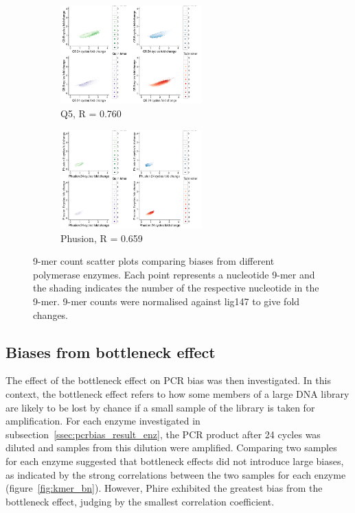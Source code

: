 \documentclass[parskip=full, numbers=noenddot]{scrreprt}
\begin{document}
\begin{figure}[htb]
\begin{subfigure}[htb]{0.6\textwidth}
    \centering
    \includegraphics[width=0.6\textwidth]{kmer_q5}
    \caption{Q5, R = 0.760}
    \label{fig:kmer_enz_q5}
  \end{subfigure}
  \begin{subfigure}[htb]{0.6\textwidth}
    \centering
    \includegraphics[width=0.6\textwidth]{kmer_phusion}
    \caption{Phusion, R = 0.659}
    \label{fig:kmer_enz_phusion}
  \end{subfigure}
  \caption{9-mer count scatter plots comparing biases from different polymerase enzymes.  Each point represents a nucleotide 9-mer and the shading indicates the number of the respective nucleotide in the 9-mer.  9-mer counts were normalised against lig147 to give fold changes.}
  \label{fig:kmer_enz}
\end{figure}

\subsection{Biases from bottleneck effect}
\label{ssec:pcrbias_result_bn}

The effect of the bottleneck effect on PCR bias was then investigated.  In this context, the bottleneck effect refers to how some members of a large DNA library are likely to be lost by chance if a small sample of the library is taken for amplification.  For each enzyme investigated in subsection~\ref{ssec:pcrbias_result_enz}, the PCR product after 24 cycles was diluted and samples from this dilution were amplified.  Comparing two samples for each enzyme suggested that bottleneck effects did not introduce large biases, as indicated by the strong correlations between the two samples for each enzyme (figure~\ref{fig:kmer_bn}).  However, Phire exhibited the greatest bias from the bottleneck effect, judging by the smallest correlation coefficient.
\end{document}
